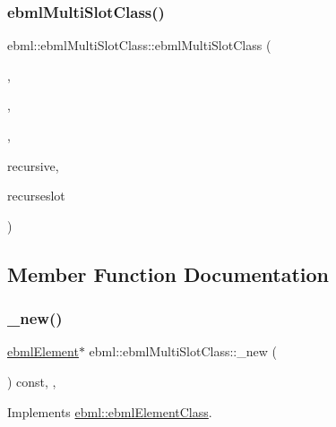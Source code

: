 \subsubsection{\texorpdfstring{ebml\+Multi\+Slot\+Class()}{ebmlMultiSlotClass()}\hspace{0.1cm}{\footnotesize\ttfamily [4/4]}}
{\footnotesize\ttfamily ebml\+::ebml\+Multi\+Slot\+Class\+::ebml\+Multi\+Slot\+Class (\begin{DoxyParamCaption}\item[{\mbox{\hyperlink{namespaceebml_a86c5f604ddf12a74aa9812e997a58691}{ebml\+I\+D\+\_\+t}}}]{,  }\item[{const std\+::wstring \&}]{,  }\item[{const \mbox{\hyperlink{namespaceebml_abdc1248164e4e424423defac9fff7d4d}{slot\+Spec\+\_\+l}} \&}]{,  }\item[{const \mbox{\hyperlink{structebml_1_1occurSpec__t}{occur\+Spec\+\_\+t}} \&}]{recursive,  }\item[{size\+\_\+t}]{recurseslot }\end{DoxyParamCaption})}



\subsection{Member Function Documentation}
\mbox{\label{classebml_1_1ebmlMultiSlotClass_ab0cb2ed53ef6a3a8e64ffc47c72f5b94}} 
\subsubsection{\texorpdfstring{\+\_\+new()}{\_new()}}
{\footnotesize\ttfamily \mbox{\hyperlink{classebml_1_1ebmlElement}{ebml\+Element}}$\ast$ ebml\+::ebml\+Multi\+Slot\+Class\+::\+\_\+new (\begin{DoxyParamCaption}{ }\end{DoxyParamCaption}) const\hspace{0.3cm}{\ttfamily [override]}, {\ttfamily [protected]}, {\ttfamily [virtual]}}



Implements \mbox{\hyperlink{classebml_1_1ebmlElementClass_a223ede6b8bc3c85251d2d73f0256fb45}{ebml\+::ebml\+Element\+Class}}.

